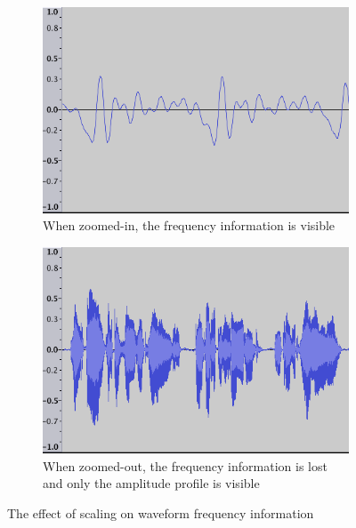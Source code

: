 \begin{figure}[p]
  \centering
  \begin{subfigure}{.5\textwidth}
    \centering
    \includegraphics[width=.9\linewidth]{figs/waveform-zoomin.png}
    \caption{When zoomed-in, the frequency information is visible}
    \label{fig:waveform-zoomin}
  \end{subfigure}%
  \begin{subfigure}{.5\textwidth}
    \centering
    \includegraphics[width=.9\linewidth]{figs/waveform-zoomout.png}
    \caption{When zoomed-out, the frequency information is lost and only the amplitude profile is visible}
    \label{fig:waveform-zoomout}
  \end{subfigure}
\caption{The effect of scaling on waveform frequency information} \label{fig:waveforms} \end{figure}

